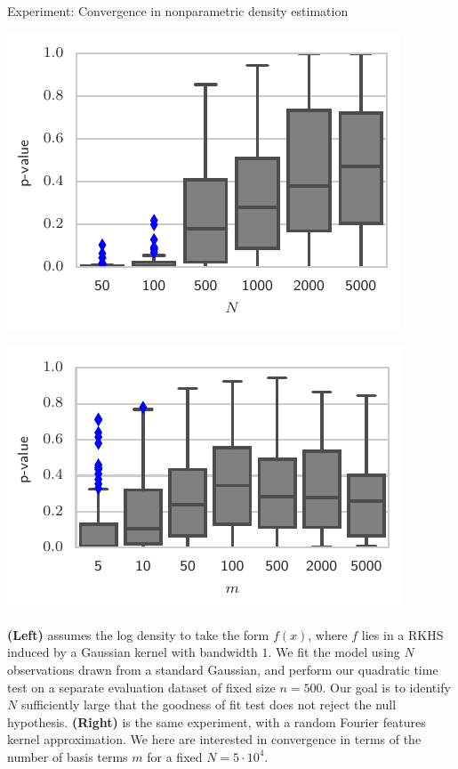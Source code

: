 \begin{frame}
\begin{columns}
\begin{column}{.32\linewidth}
\begin{block}{Experiment: Convergence in nonparametric density estimation}
\begin{center}
\begin{minipage}{.45\linewidth}
            \includegraphics[width=\textwidth]{../../presentation/img/increasing_data_fixed_test}
\end{minipage}
\begin{minipage}{.450\linewidth}
\includegraphics[width=\textwidth]{../../presentation/img/increasing_features_fixed_test}\\
\end{minipage}

\end{center}

\footnotesize
\textbf{(Left)} assumes
the log density to take the form $f(x)$, where $f$ lies in a RKHS
induced by a Gaussian kernel with bandwidth $1$. We fit the model
using $N$ observations drawn from a standard Gaussian, and perform
our quadratic time test on a separate evaluation dataset of fixed
size $n=500$. Our goal is to identify $N$ sufficiently large that
the goodness of fit test does not reject the null hypothesis.
\textbf{(Right)} is the same experiment, with a random Fourier features kernel approximation. We here are interested in convergence in terms of the number of basis terms $m$ for a fixed $N=5\cdot10^4$.


\end{block}
\end{column}
\end{columns}
\end{frame}
